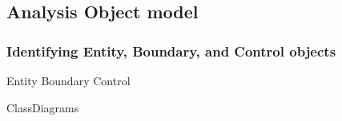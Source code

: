 \subsection{Analysis Object model}

\subsubsection{Identifying Entity, Boundary, and Control objects}

{Entity}
{Boundary}
{Control}

{ClassDiagrams}
